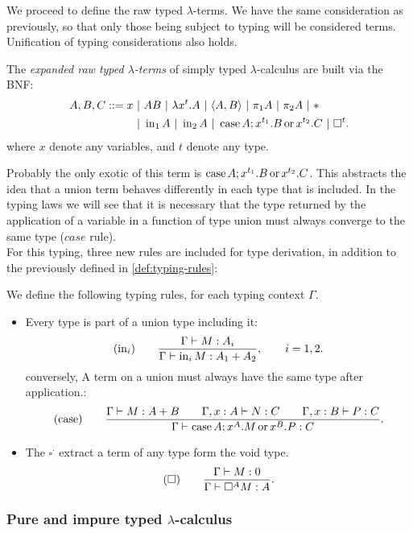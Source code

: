 We proceed to define the raw typed $\lambda$-terms. We have the same consideration as previously, so that only those being subject to typing will be considered terms. Unification of typing considerations also holds.
\begin{definition}
  The \emph{expanded raw typed $\lambda$-terms} of simply typed $\lambda$-calculus are built via the BNF:
  \begin{align*}
    A,B, C ::= x\ &|\ AB\ |\ \lambda x^t.A \ |\ \langle A,B \rangle\ |\ \pi_1A\ |\ \pi_2A\ |\ * \\
               &|\ \iin_1 A\ |\ \iin_2 A \ |\ \ccase A ; x^{t_1}.B\oo x^{t_2}.C \ |\ \square^t. 
  \end{align*}
  where $x$ denote any variables, and $t$ denote any type. 
\end{definition}

Probably the only exotic of this term is $\operatorname{case} A ; x^{t_1}.B\operatorname{ or } x^{t_2}.C$. This abstracts the idea that a union term behaves differently in each type that is included. In the typing laws we will see that it is necessary that the type returned by the application of a variable in a function of type union must always converge to the same type ($case$ rule).\\

For this typing, three new rules are included for type derivation, in addition to the previously defined in \ref{def:typing-rules}:
\begin{definition}
  We define the following typing rules, for each typing context $\Gamma$.
  \begin{itemize}
  \item Every type is part of a union type including it:
    $$  (\operatorname{in}_i)\qquad  {\displaystyle\Gamma \vdash M:A_i \over \Gamma \vdash \operatorname{in}_i M:A_1+A_2},\qquad  i=  1,2.$$
  conversely, A term on a union must always have the same type after application.:
    $$(\operatorname{case}) \qquad {\displaystyle \Gamma\vdash M: A+B\qquad \Gamma, x:A\vdash N: C\qquad \Gamma, x:B\vdash P: C \over \Gamma \vdash \operatorname{case}A ; x^{A}.M\operatorname{ or }x^{B}.P:C}.$$
  \item The $\square^\cdot$ extract a term of any type form the void type.
    $$  (\square)\qquad  {\displaystyle\Gamma \vdash M:0 \over \Gamma \vdash \square^A M:A}.$$
  \end{itemize}
\end{definition}

\subsubsection{Pure and impure typed $\lambda$-calculus}

